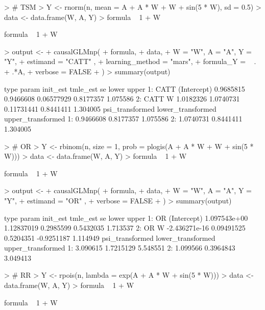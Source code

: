 \documentclass{article}
\begin{document}
\begin{Schunk}
\begin{Sinput}
> # TSM
> Y <- rnorm(n, mean = A + A * W + W + sin(5 * W), sd = 0.5)
> data <- data.frame(W, A, Y)
> formula ~ 1 + W
\end{Sinput}
\begin{Soutput}
formula ~ 1 + W
\end{Soutput}
\begin{Sinput}
> output <-
+   causalGLMnp(
+     formula,
+     data,
+     W = "W", A = "A", Y = "Y",
+     estimand = "CATT" ,
+     learning_method = "mars",
+     formula_Y = ~ . + .*A,
+     verbose = FALSE
+   )
> summary(output)
\end{Sinput}
\begin{Soutput}
   type       param  init_est  tmle_est         se     lower    upper
1: CATT (Intercept) 0.9685815 0.9466608 0.06577929 0.8177357 1.075586
2: CATT           W 1.0182326 1.0740731 0.11731441 0.8441411 1.304005
   psi_transformed lower_transformed upper_transformed
1:       0.9466608         0.8177357          1.075586
2:       1.0740731         0.8441411          1.304005
\end{Soutput}
\begin{Sinput}
> # OR
> Y <- rbinom(n, size =  1, prob = plogis(A + A * W + W + sin(5 * W)))
> data <- data.frame(W, A, Y)
> formula ~ 1 + W
\end{Sinput}
\begin{Soutput}
formula ~ 1 + W
\end{Soutput}
\begin{Sinput}
> output <-
+   causalGLMnp(
+     formula,
+     data,
+     W = "W", A = "A", Y = "Y",
+     estimand = "OR" ,
+     verbose = FALSE
+   )
> summary(output)
\end{Sinput}
\begin{Soutput}
   type       param      init_est   tmle_est        se      lower    upper
1:   OR (Intercept)  1.097543e+00 1.12837019 0.2985599  0.5432035 1.713537
2:   OR           W -2.436271e-16 0.09491525 0.5204351 -0.9251187 1.114949
   psi_transformed lower_transformed upper_transformed
1:        3.090615         1.7215129          5.548551
2:        1.099566         0.3964843          3.049413
\end{Soutput}
\begin{Sinput}
> # RR
> Y <- rpois(n, lambda = exp(A + A * W + sin(5 * W)))
> data <- data.frame(W, A, Y)
> formula ~ 1 + W
\end{Sinput}
\begin{Soutput}
formula ~ 1 + W
\end{Soutput}
\begin{Sinput}

\end{Sinput}
\end{Schunk}
\end{document}
